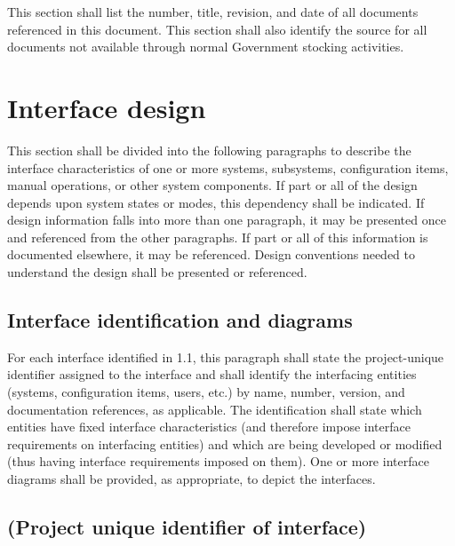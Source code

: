 \documentclass{fidata-report-template}
\begin{document}
This section shall list the number, title, revision, and date of all
documents referenced in this document. This section shall also identify
the source for all documents not available through normal Government
stocking activities.

\section{Interface design}

This section shall be divided into the following paragraphs to describe
the interface characteristics of one or more systems, subsystems,
configuration items, manual operations, or other system components. If
part or all of the design depends upon system states or modes, this
dependency shall be indicated. If design information falls into more
than one paragraph, it may be presented once and referenced from the
other paragraphs. If part or all of this information is documented
elsewhere, it may be referenced. Design conventions needed to understand
the design shall be presented or referenced.

\subsection{Interface identification and diagrams}

For each interface identified in 1.1, this paragraph shall state the
project-unique identifier assigned to the interface and shall identify
the interfacing entities (systems, configuration items, users, etc.) by
name, number, version, and documentation references, as applicable. The
identification shall state which entities have fixed interface
characteristics (and therefore impose interface requirements on
interfacing entities) and which are being developed or modified (thus
having interface requirements imposed on them). One or more interface
diagrams shall be provided, as appropriate, to depict the interfaces.

\subsection{(Project unique identifier of interface)}
\end{document}
